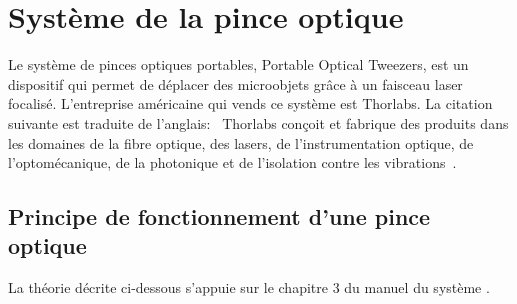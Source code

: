 


\section{Système de la pince optique}

Le système de pinces optiques portables, Portable Optical Tweezers, est un dispositif qui permet de déplacer des microobjets grâce à un faisceau laser focalisé. L'entreprise américaine qui vends ce système est Thorlabs. La citation suivante est traduite de l'anglais: \guillemotleft{}~Thorlabs conçoit et fabrique des produits dans les domaines de la fibre optique, des lasers, de l'instrumentation optique, de l'optomécanique, de la photonique et de l'isolation contre les vibrations~\guillemotright{}\cite{thorlabsWikipedia}.

\subsection{Principe de fonctionnement d'une pince optique}

La théorie décrite ci-dessous s'appuie sur le chapitre 3 du manuel du système \cite{manualPortableOpticalTweezers}.

